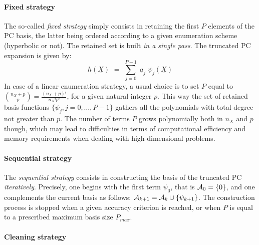 {  \paragraph*{Fixed strategy\\}

  The so-called \emph{fixed strategy} simply consists in retaining the first $P$ elements of the PC basis, the latter being ordered according to a given enumeration scheme (hyperbolic or not). The retained set is built \emph{in a single pass}. The truncated PC expansion is given by:
  \begin{equation}
    \widehat{h}(\underline{X}) \, \, = \, \, \sum_{j=0}^{P-1} \; \underline{a}_{j} \; \psi_{j}(\underline{X})
  \end{equation}
  In case of a linear enumeration strategy, a usual choice is to set $P$ equal to $\binom{n_X+p}{p} = \frac{(n_X+p)!}{n_X!p!}$, for a given natural integer $p$. This way the set of retained basis functions $\{\psi_{j},j=0,\dots,P-1\}$ gathers all the polynomials with total degree not greater than $p$. The number of terms $P$ grows polynomially both in $n_X$ and $p$ though, which may lead to difficulties in terms of computational efficiency and memory requirements when dealing with high-dimensional problems.

  \paragraph*{Sequential strategy\\}

  The \emph{sequential strategy} consists in constructing the basis of the truncated PC \emph{iteratively}. Precisely, one begins with the first term $\psi_0$, that is ${\mathcal A}_{0} = \{0\}$, and one complements the current basis as follows: ${\mathcal A}_{k+1} = {\mathcal A}_{k} \cup \{\psi_{k+1}\}$. The construction process is stopped when a given accuracy criterion is reached, or when $P$ is equal to a prescribed maximum basis size $P_{max}$.

  \paragraph*{Cleaning strategy\\}

}
